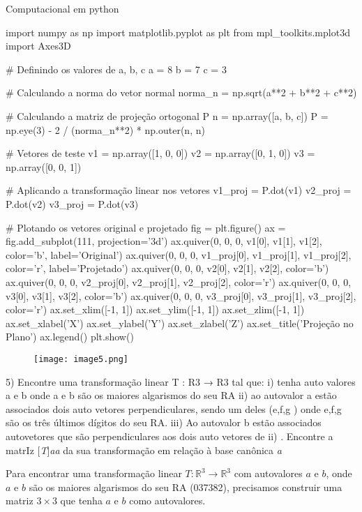 Computacional em python

import numpy as np
import matplotlib.pyplot as plt
from mpl_toolkits.mplot3d import Axes3D

# Definindo os valores de a, b, c
a = 8
b = 7
c = 3

# Calculando a norma do vetor normal
norma_n = np.sqrt(a**2 + b**2 + c**2)

# Calculando a matriz de projeção ortogonal P
n = np.array([a, b, c])
P = np.eye(3) - 2 / (norma_n**2) * np.outer(n, n)

# Vetores de teste
v1 = np.array([1, 0, 0])
v2 = np.array([0, 1, 0])
v3 = np.array([0, 0, 1])

# Aplicando a transformação linear nos vetores
v1_proj = P.dot(v1)
v2_proj = P.dot(v2)
v3_proj = P.dot(v3)

# Plotando os vetores original e projetado
fig = plt.figure()
ax = fig.add_subplot(111, projection='3d')
ax.quiver(0, 0, 0, v1[0], v1[1], v1[2], color='b', label='Original')
ax.quiver(0, 0, 0, v1_proj[0], v1_proj[1], v1_proj[2], color='r', label='Projetado')
ax.quiver(0, 0, 0, v2[0], v2[1], v2[2], color='b')
ax.quiver(0, 0, 0, v2_proj[0], v2_proj[1], v2_proj[2], color='r')
ax.quiver(0, 0, 0, v3[0], v3[1], v3[2], color='b')
ax.quiver(0, 0, 0, v3_proj[0], v3_proj[1], v3_proj[2], color='r')
ax.set_xlim([-1, 1])
ax.set_ylim([-1, 1])
ax.set_zlim([-1, 1])
ax.set_xlabel('X')
ax.set_ylabel('Y')
ax.set_zlabel('Z')
ax.set_title('Projeção no Plano')
ax.legend()
plt.show()

\begin{figure}
    \centering
    \texttt{[image: image5.png]}

\end{figure}

5) Encontre uma transformação linear T : R3 → R3 tal que: 
i) tenha auto valores a e b onde a e b são os maiores algarismos do seu RA 
ii) ao autovalor a estão associados dois auto vetores perpendiculares, sendo um deles (e,f,g ) onde e,f,g são os três últimos dígitos do seu RA. 
iii) Ao autovalor b estão associados autovetores que são perpendiculares aos dois auto vetores de ii) . Encontre a matrIz [\textit{T}]\textit{aa}  da sua transformação em relação à base canônica \textit{a} 

Para encontrar uma transformação linear \( T : \mathbb{R}^3 \rightarrow \mathbb{R}^3 \) com autovalores \( a \) e \( b \), onde \( a \) e \( b \) são os maiores algarismos do seu RA (037382), precisamos construir uma matriz \( 3 \times 3 \) que tenha \( a \) e \( b \) como autovalores.

